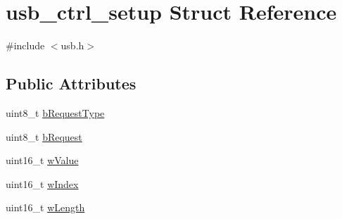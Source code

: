 \hypertarget{structusb__ctrl__setup}{\section{usb\-\_\-ctrl\-\_\-setup Struct Reference}
\label{structusb__ctrl__setup}
}


{\ttfamily \#include $<$usb.\-h$>$}

\subsection*{Public Attributes}
\begin{DoxyCompactItemize}
\item 
uint8\-\_\-t \hyperlink{structusb__ctrl__setup_ab1f272fb865f64a82a76ee2b32d8734a}{b\-Request\-Type}
\item 
uint8\-\_\-t \hyperlink{structusb__ctrl__setup_aad44a5f779b628a7149cbd5c40fd78c8}{b\-Request}
\item 
uint16\-\_\-t \hyperlink{structusb__ctrl__setup_aa5608da205f09c16cb1672572a75b87f}{w\-Value}
\item 
uint16\-\_\-t \hyperlink{structusb__ctrl__setup_a36421d32b1136a470c2ac905bebb16ff}{w\-Index}
\item 
uint16\-\_\-t \hyperlink{structusb__ctrl__setup_abd54b552fbda8d7e6a7e01f59c7e46c0}{w\-Length}
\end{DoxyCompactItemize}


